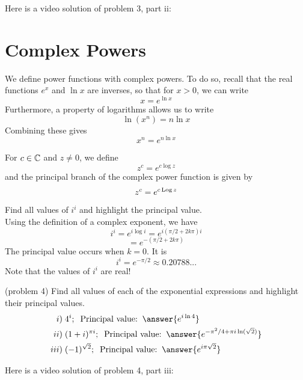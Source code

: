 \documentclass[handout]{ximera}
\begin{document}
Here is a video solution of problem 3, part ii:\\
\begin{foldable}
\end{foldable}



\section{Complex Powers}
We define power functions with complex powers. To do so, recall that the real functions $e^x$ and $\ln x$ 
are inverses, so that for $x>0$, we can write
\[
x = e^{\ln x}
\]
Furthermore, a property of logarithms allows us to write
\[
\ln(x^n) = n \ln x
\]
Combining these gives
\[
x^n = e^{n\ln x}
\]
\begin{definition}
For $c \in \mathbb C$ and $z \neq 0$, we define
\[
z^c = e^{c \log z}
\]
and the principal branch of the complex power function is given by
\[
z^c = e^{c \operatorname{Log} z}
\]
\end{definition}

\begin{example}[example 4]
Find all values of $i^i$ and highlight the principal value.\\
Using the definition of a complex exponent, we have
\[
i^i = e^{i\log i} = e^{i(\pi/2 + 2k\pi)i} 
\]
\[
= e^{-(\pi/2 + 2k\pi)}
\]
The principal value occurs when $k=0$.  It is
\[
i^i = e^{-\pi/2} \approx 0.20788...
\]
Note that the values of $i^i$ are real!
\end{example}

\begin{problem}(problem 4)
Find all values of each of the exponential expressions and highlight their principal values.\\
\begin{align*}
i) &\; 4^i; \;\; \mbox{Principal value:}\;\; \answer{e^{i\ln 4}}\\
ii) & \;(1+i)^{\pi i}; \;\;\mbox{Principal value:}\;\; \answer{e^{-\pi^2/4 + \pi i \ln(\sqrt2)}}\\
iii) & \;(-1)^{\sqrt 2}; \;\;\mbox{Principal value:}\;\; \answer{e^{i\pi\sqrt 2}}
\end{align*}
\end{problem}

Here is a video solution of problem 4, part iii:\\
\begin{foldable}
\end{foldable}
\end{document}
